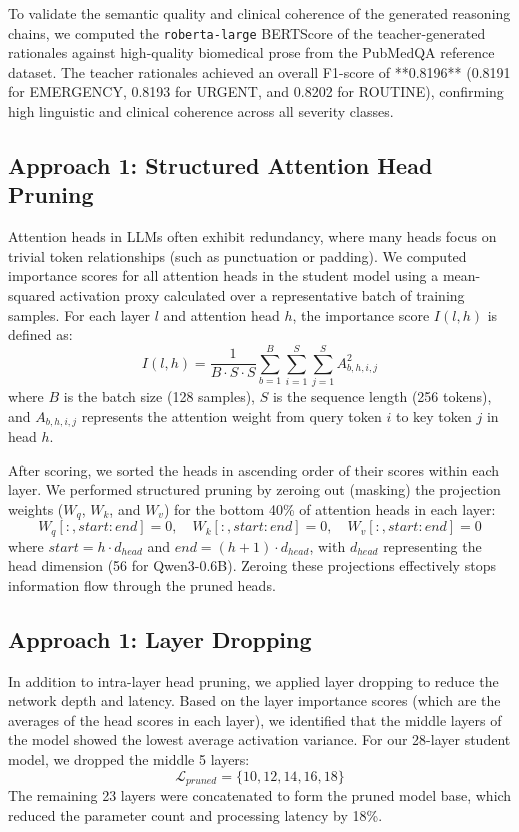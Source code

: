 \documentclass[a4paper, 12pt]{article}
\begin{document}
To validate the semantic quality and clinical coherence of the generated reasoning chains, we computed the \texttt{roberta-large} BERTScore of the teacher-generated rationales against high-quality biomedical prose from the PubMedQA reference dataset. The teacher rationales achieved an overall F1-score of **0.8196** (0.8191 for EMERGENCY, 0.8193 for URGENT, and 0.8202 for ROUTINE), confirming high linguistic and clinical coherence across all severity classes.

\subsection{Approach 1: Structured Attention Head Pruning}
Attention heads in LLMs often exhibit redundancy, where many heads focus on trivial token relationships (such as punctuation or padding). We computed importance scores for all attention heads in the student model using a mean-squared activation proxy calculated over a representative batch of training samples. For each layer $l$ and attention head $h$, the importance score $I(l, h)$ is defined as:
\begin{equation}
I(l, h) = \frac{1}{B \cdot S \cdot S} \sum_{b=1}^{B} \sum_{i=1}^{S} \sum_{j=1}^{S} A_{b, h, i, j}^2
\end{equation}
where $B$ is the batch size (128 samples), $S$ is the sequence length (256 tokens), and $A_{b, h, i, j}$ represents the attention weight from query token $i$ to key token $j$ in head $h$.

After scoring, we sorted the heads in ascending order of their scores within each layer. We performed structured pruning by zeroing out (masking) the projection weights ($W_q$, $W_k$, and $W_v$) for the bottom 40\% of attention heads in each layer:
\begin{equation}
W_{q}[:, start:end] = 0, \quad W_{k}[:, start:end] = 0, \quad W_{v}[:, start:end] = 0
\end{equation}
where $start = h \cdot d_{head}$ and $end = (h+1) \cdot d_{head}$, with $d_{head}$ representing the head dimension (56 for Qwen3-0.6B). Zeroing these projections effectively stops information flow through the pruned heads.

\subsection{Approach 1: Layer Dropping}
In addition to intra-layer head pruning, we applied layer dropping to reduce the network depth and latency. Based on the layer importance scores (which are the averages of the head scores in each layer), we identified that the middle layers of the model showed the lowest average activation variance. For our 28-layer student model, we dropped the middle 5 layers:
\begin{equation}
\mathcal{L}_{pruned} = \{10, 12, 14, 16, 18\}
\end{equation}
The remaining 23 layers were concatenated to form the pruned model base, which reduced the parameter count and processing latency by 18\%.
\end{document}
